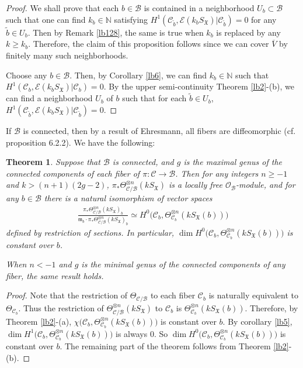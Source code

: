 \documentclass[12pt,b5paper,notitlepage]{report}
\theoremstyle{definition}
\theoremstyle{plain}
\newtheorem{thm}[df]{Theorem}
\newcommand{\fk}{\mathfrak}
\newcommand{\mc}{\mathcal}
\newcommand{\wtd}{\widetilde}
\newcommand{\ovl}{\overline}
\newcommand{\scr}{\mathscr}
\newcommand{\SX}{S_{\fk X}}
\newcommand{\Nbb}{\mathbb N}
\numberwithin{equation}{section}
\begin{document}
\begin{proof}
We shall prove that  each $b\in\mc B$ is contained in a neighborhood $U_b\subset\mc B$ such that one can find $k_b\in\Nbb$ satisfying $H^1(\mc C_{\wtd b},\scr E(k_b\SX)|\mc C_{\wtd b})=0$ for any  $\wtd b\in U_b$. Then by Remark \ref{lb128}, the same is true when $k_b$ is replaced by any $k\geq k_b$.  Therefore, the claim of this proposition follows since we can cover $\ovl V$ by finitely many such neighborhoods.

Choose any $b\in\mc B$. Then, by Corollary \ref{lb6}, we can find $k_b\in\Nbb$ such that $H^1(\mc C_b,\scr E(k_b\SX)|\mc C_b)=0$. By the upper semi-continuity Theorem \ref{lb2}-(b), we can find a neighborhood $U_b$ of $b$ such that for each $\wtd b\in U_b$, $H^1(\mc C_{\wtd b},\scr E(k_b\SX)|\mc C_{\wtd b})=0$.
\end{proof}





If $\mc B$ is connected, then by a result of Ehresmann, all fibers are diffeomorphic (cf. \cite{Huy06} proposition 6.2.2). We have the following:





\begin{thm}\label{lb8}
Suppose that $\mc B$ is connected, and $g$ is the maximal genus of the connected components of each fiber of $\pi:\mc C\rightarrow\mc B$. Then for any integers $n\geq-1$ and $k>(n+1)(2g-2)$, $\pi_*\Theta_{\mc C/\mc B}^{\otimes n}(k\SX)$ is a locally free $\scr O_{\mc B}$-module, and for any $b\in \mc B$ there is a natural isomorphism of vector spaces
\begin{align}
\frac{\pi_*\Theta_{\mc C/\mc B}^{\otimes n}(k\SX)_b}{\fk m_b\cdot\pi_*\Theta_{\mc C/\mc B}^{\otimes n}(k\SX)_b}\simeq H^0\big(\mc C_b,\Theta_{\mc C_b}^{\otimes n}(k\SX(b))\big)\label{eq6}
\end{align} 
defined by restriction of sections. In particular,  $\dim H^0\big(\mc C_b,\Theta_{\mc C_b}^{\otimes n}(k\SX(b))\big)$ is constant over $b$.

When $n<-1$ and $g$ is the minimal genus of the connected components of any fiber, the same result holds.
\end{thm}



\begin{proof}
Note that the restriction of $\Theta_{\mc C/\mc B}$ to each fiber $\mc C_b$ is naturally equivalent to $\Theta_{\mc C_b}$. Thus the restriction of $\Theta_{\mc C/\mc B}^{\otimes n}(k\SX)$ to $\mc C_b$ is $\Theta_{\mc C_b}^{\otimes n}(k\SX(b))$. Therefore, by Theorem \ref{lb2}-(a), $\chi\big(\mc C_b,\Theta_{\mc C_b}^{\otimes n}(k\SX(b))\big)$ is constant over $b$. By corollary  \ref{lb5}, $\dim H^1\big(\mc C_b,\Theta_{\mc C_b}^{\otimes n}(k\SX(b))\big)$ is always $0$. So  $\dim H^0\big(\mc C_b,\Theta_{\mc C_b}^{\otimes n}(k\SX(b))\big)$ is constant over $b$. The remaining part of the theorem follows from Theorem \ref{lb2}-(b).
\end{proof}
\end{document}

